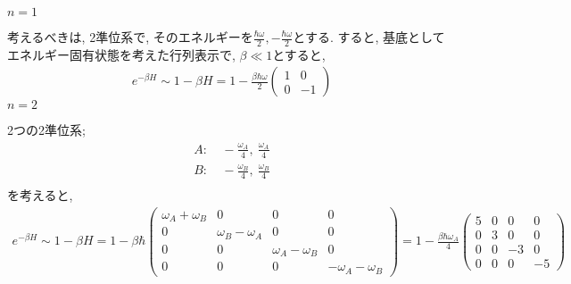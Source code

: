 \begin{ex}
    \label{ex7.36}
    \underline{$n=1$}\par
    考えるべきは, 2準位系で, そのエネルギーを$\frac{\hbar \omega}{2}, -\frac{\hbar \omega}{2}$とする.
    すると, 基底としてエネルギー固有状態を考えた行列表示で, $\beta \ll 1$とすると,
    \begin{align*}
        e^{- \beta H} \sim 1 - \beta H = 1 - \frac{\beta \hbar \omega}{2}
        \begin{pmatrix}
            1 & 0  \\
            0 & -1
        \end{pmatrix}
    \end{align*}
    \underline{$n=2$}\par
    2つの2準位系;
    \begin{align*}
        A: & \ - \frac{\omega_A}{4} ,\ \frac{\omega_A}{4} \\
        B: & \ - \frac{\omega_B}{4} ,\ \frac{\omega_B}{4} \\
    \end{align*}
    を考えると,
    \begin{align*}
        e^{- \beta H} \sim 1 - \beta H
        = 1 - \beta \hbar
        \begin{pmatrix}
            \omega_A + \omega_B & 0                   & 0                   & 0                    \\
            0                   & \omega_B - \omega_A & 0                   & 0                    \\
            0                   & 0                   & \omega_A - \omega_B & 0                    \\
            0                   & 0                   & 0                   & - \omega_A -\omega_B
        \end{pmatrix}
        =
        1-
        \frac{\beta \hbar \omega_A}{4}
        \begin{pmatrix}
            5 & 0 & 0  & 0  \\
            0 & 3 & 0  & 0  \\
            0 & 0 & -3 & 0  \\
            0 & 0 & 0  & -5
        \end{pmatrix}
    \end{align*}
\end{ex}

